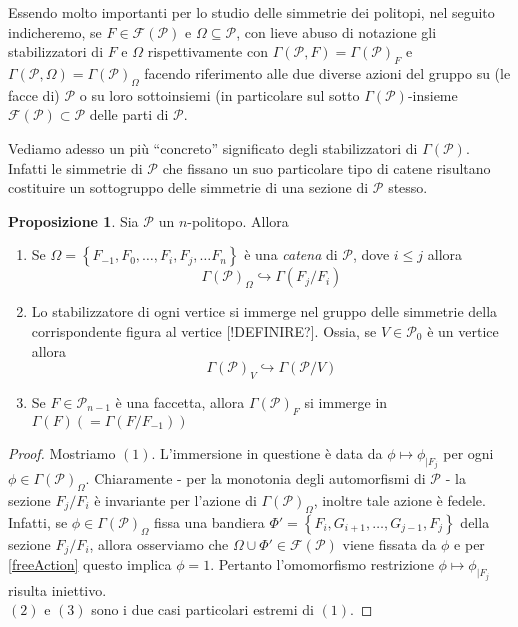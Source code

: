 \documentclass[a4paper,12pt]{report}
\newcommand{\p}{\mathcal{P}}
\theoremstyle{plain}
\theoremstyle{definition}
\newtheorem{prop}[teo]{Proposizione}
\begin{document}
Essendo molto importanti per lo studio delle simmetrie dei politopi, nel seguito indicheremo, se $F\in\mathcal{F}(\p)$ e
$\Omega\subseteq\p$, con lieve abuso di notazione gli stabilizzatori di $F$ e $\Omega$ rispettivamente con $\Gamma(\p,F)=\Gamma(\p)_F$ e
$\Gamma(\p,\Omega)=\Gamma(\p)_\Omega$ facendo riferimento alle due diverse azioni del gruppo su (le facce di) $\p$ o su loro sottoinsiemi
(in particolare sul sotto $\Gamma(\p)$-insieme $\mathcal{F}(\p)\subset\mathcal{P}$ delle parti di $\p$.

Vediamo adesso un pi\`u ``concreto'' significato degli stabilizzatori di $\Gamma(\p)$. Infatti le simmetrie di $\p$ che fissano un suo particolare tipo di
catene risultano costituire un sottogruppo delle simmetrie di una sezione di $\p$ stesso.

\begin{prop}
\label{prop:SectionGroups}
Sia $\p$ un $n$-politopo. Allora
\begin{enumerate}
\item Se $\Omega=\left\{F_{-1},F_0,\dots,F_i,F_j,\dots F_n\right\}$ \`e una \emph{catena} di $\p$, dove $i\leq j$ allora
\begin{equation*}
\Gamma(\p)_\Omega\hookrightarrow\Gamma(F_j/F_i)
\end{equation*}
\item Lo stabilizzatore di ogni vertice si immerge nel gruppo delle simmetrie della corrispondente figura al vertice [!DEFINIRE?]. Ossia, se $V\in\p_0$ \`e un vertice allora
\begin{equation*}
\Gamma(\p)_V\hookrightarrow\Gamma(\p/V)
\end{equation*}
\item Se $F\in\p_{n-1}$ \`e una faccetta, allora $\Gamma(\p)_F$ si immerge in $\Gamma(F)(=\Gamma(F/F_{-1}))$
\end{enumerate}
\begin{proof}
Mostriamo $(1)$. L'immersione in questione \`e data da $\phi\mapsto\phi_{\mid F_j}$ per ogni $\phi\in\Gamma(\p)_\Omega$. Chiaramente - per la monotonia degli
automorfismi di $\p$ - la sezione $F_j/F_i$ \`e invariante per l'azione di $\Gamma(\p)_\Omega$,
inoltre tale azione \`e fedele. Infatti, se $\phi\in\Gamma(\p)_\Omega$ fissa una bandiera $\Phi'=\left\{F_i,G_{i+1},\dots,G_{j-1},F_j\right\}$ della sezione
$F_j/F_i$, allora osserviamo che $\Omega\cup\Phi'\in\mathcal{F}(\p)$ viene fissata da $\phi$ e per \ref{freeAction} questo implica $\phi=1$. Pertanto l'omomorfismo restrizione $\phi\mapsto\phi_{\mid F_j}$ risulta iniettivo.\\
$(2)$ e $(3)$ sono i due casi particolari estremi di $(1)$.
\end{proof}
\end{prop}
\end{document}
